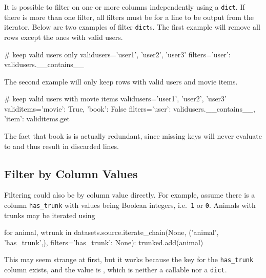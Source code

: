 It is possible to filter on one or more columns independently using a
\texttt{dict}.  If there is more than one filter, all filters must be
\pyTrue for a line to be output from the iterator.
Below are two examples of filter \texttt{dict}s.  The first example
will remove all rows except the ones with valid users.
\begin{python}
# keep valid users only
validusers={'user1', 'user2', 'user3'}
filters={'user': validusers.__contains__}
\end{python}
The second example will only keep rows with valid users and movie
items.
\begin{python}
# keep valid users with movie items
validusers={'user1', 'user2', 'user3'}
validitems={'movie': True, 'book': False}
filters={'user': validusers.__contains__, 'item': validitems.get}
\end{python}
The fact that book is \pyFalse is actually redundant, since
missing keys will never evaluate to \pyTrue and thus result in
discarded lines.




\subsection*{Filter by Column Values}

Filtering could also be by column value directly.  For example, assume
there is a column \texttt{has\_trunk} with values being Boolean
integers, i.e.\ \texttt{1} or \texttt{0}.  Animals with trunks may be
iterated using
\begin{python}
for animal, wtrunk in datasets.source.iterate_chain(None,
                      ('animal', 'has_trunk',),
                      filters={'has_trunk': None}):
    trunked.add(animal)
\end{python}
This may seem strange at first, but it works because the key for
the \texttt{has\_trunk} column exists, and the value is
\pyNone, which is neither a callable nor a \texttt{dict}.




